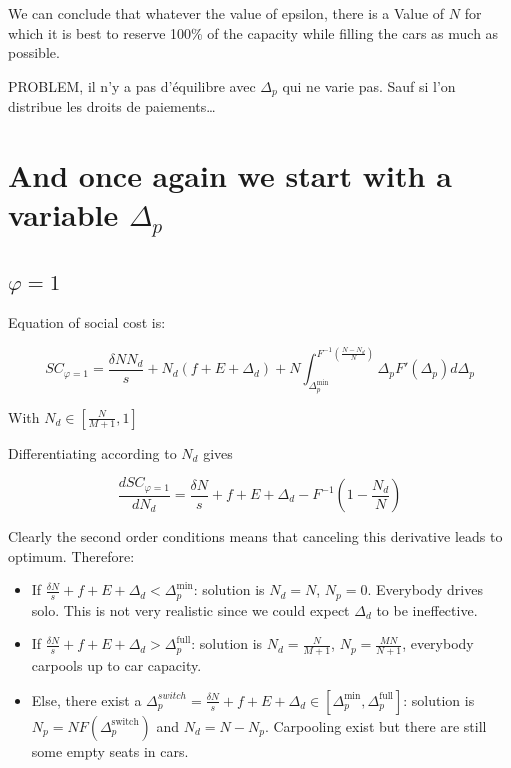 \documentclass[english, a4paper]{article}
\theoremstyle{plain}
\theoremstyle{definition}
\theoremstyle{remark}
\begin{document}
    We can conclude that whatever the value of epsilon, there is a Value of $N$ for which it is best to reserve 100\% of the capacity while filling the cars as much as possible.

    PROBLEM, il n’y a pas d’équilibre avec $\Delta_p$ qui ne varie pas. Sauf si l’on distribue les droits de paiements…


    \section{And once again we start with a variable $\Delta_p$}

    \subsection{$\varphi = 1$}

    Equation of social cost is:

    \begin{equation}
        SC_{\varphi = 1} = \frac{\delta NN_d}{s} + N_d (f+E + \Delta_d) + N\int_{\Delta_p^{\text{min}}}^{F^{-1} \left( \frac{N - N_d}{N} \right)} \Delta_p F'(\Delta_p) d\Delta_p
    \end{equation}

    With $N_d \in \left[ \frac{N}{M+1}, 1 \right]$

    Differentiating according to $N_d$ gives

    \begin{equation}
        \frac{dSC_{\varphi = 1}}{dN_d} = \frac{\delta N}{s} + f + E + \Delta_d - F^{-1}\left( 1 - \frac{N_d}{N} \right)
    \end{equation}

    Clearly the second order conditions means that canceling this derivative leads to optimum. Therefore:

    \begin{itemize}
        \item If $\frac{\delta N}{s} + f + E + \Delta_d < \Delta_p^{\text{min}}$: solution is $N_d = N$, $N_p = 0$. Everybody drives solo. This is not very realistic since we could expect $\Delta_d$ to be ineffective.
        \item If $\frac{\delta N}{s} + f + E + \Delta_d > \Delta_p^{\text{full}}$: solution is $N_d = \frac{N}{M+1}$, $N_p = \frac{MN}{N+1}$, everybody carpools up to car capacity.
        \item Else, there exist a $\Delta_p^{switch} = \frac{\delta N}{s} + f + E + \Delta_d \in [\Delta_p^{\text{min}}, \Delta_p^{\text{full}}]$: solution is $N_p = NF(\Delta_p^{\text{switch}})$ and $N_d = N - N_p$. Carpooling exist but there are still some empty seats in cars.
    \end{itemize}
    
\end{document}

